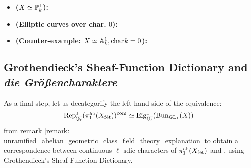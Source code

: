         \begin{example} \label{example: geometric_reciprocity}
            \noindent
            \begin{itemize}
                \item \textbf{($X \cong \P^1_k$):}
                \item \textbf{(Elliptic curves over char. $0$):}
                \item \textbf{(Counter-example: $X \cong \A^1_k, \chara k = 0$):}
            \end{itemize}
        \end{example}
        
    \subsection{Grothendieck's Sheaf-Function Dictionary and \textit{die Gr\"o{\ss}encharaktere}}
        As a final step, let us decategorify the left-hand side of the equivalence:
            $$\Rep_{\overline{\Q_{\ell}}}^1(\pi_1^{\ab}(X_{\fet}))^{\cont} \cong \Eig^1_{\overline{\Q_{\ell}}}(\Bun_{\GL_1}(X))$$
        from remark \ref{remark: unramified_abelian_geometric_class_field_theory_explanation} to obtain a correspondence between continuous $\ell$-adic characters of $\pi_1^{\ab}(X_{\fet})$ and , using Grothendieck's Sheaf-Function Dictionary.